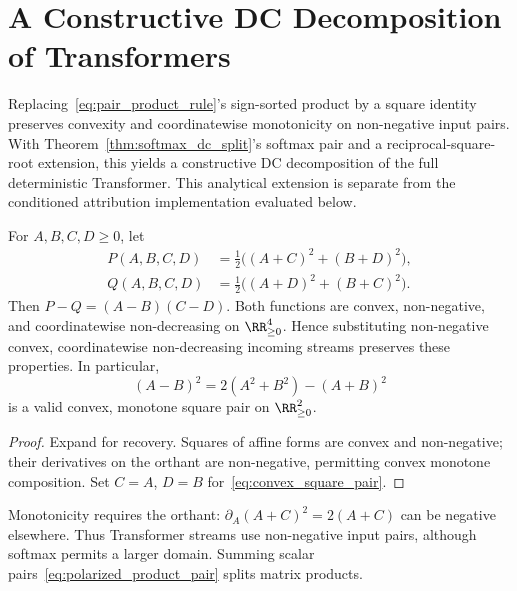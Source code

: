 \section{A Constructive DC Decomposition of Transformers}\label{sec:transformer_dc}

Replacing~\eqref{eq:pair_product_rule}'s sign-sorted product by a square identity preserves convexity and coordinatewise monotonicity on non-negative input pairs. With Theorem~\ref{thm:softmax_dc_split}'s softmax pair and a reciprocal-square-root extension, this yields a constructive DC decomposition of the full deterministic Transformer. This analytical extension is separate from the conditioned attribution implementation evaluated below.

\begin{proposition}\label{prop:convex_product_pair}
For $A,B,C,D\ge0$, let
\begin{equation}
\begin{aligned}
    P(A,B,C,D)&=\tfrac12\bigl((A+C)^2+(B+D)^2\bigr),\\
    Q(A,B,C,D)&=\tfrac12\bigl((A+D)^2+(B+C)^2\bigr).
\end{aligned}
    \label{eq:polarized_product_pair}
\end{equation}
Then $P-Q=(A-B)(C-D)$. Both functions are convex, non-negative, and coordinatewise non-decreasing on $\RR^4_{\ge0}$. Hence substituting non-negative convex, coordinatewise non-decreasing incoming streams preserves these properties. In particular,
\begin{equation}
    (A-B)^2=2(A^2+B^2)-(A+B)^2
    \label{eq:convex_square_pair}
\end{equation}
is a valid convex, monotone square pair on $\RR^2_{\ge0}$.
\end{proposition}

\begin{proof}
Expand for recovery. Squares of affine forms are convex and non-negative; their derivatives on the orthant are non-negative, permitting convex monotone composition. Set $C=A$, $D=B$ for~\eqref{eq:convex_square_pair}.
\end{proof}

Monotonicity requires the orthant: $\partial_A(A+C)^2=2(A+C)$ can be negative elsewhere. Thus Transformer streams use non-negative input pairs, although softmax permits a larger domain. Summing scalar pairs~\eqref{eq:polarized_product_pair} splits matrix products.

